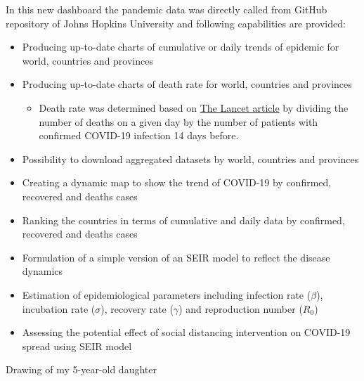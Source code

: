 \documentclass[
]{article}
\providecommand{\tightlist}{%
  \setlength{\itemsep}{0pt}\setlength{\parskip}{0pt}}
\begin{document}
In this new dashboard the pandemic data was directly called from GitHub
repository of Johns Hopkins University and following capabilities are
provided:

\begin{itemize}
\tightlist
\item
  Producing up-to-date charts of cumulative or daily trends of epidemic
  for world, countries and provinces
\item
  Producing up-to-date charts of death rate for world, countries and
  provinces

  \begin{itemize}
  \tightlist
  \item
    Death rate was determined based on
    \href{https://www.thelancet.com/journals/laninf/article/PIIS1473-3099\%2820\%2930195-X/fulltext}{The
    Lancet article} by dividing the number of deaths on a given day by
    the number of patients with confirmed COVID-19 infection 14 days
    before.
  \end{itemize}
\item
  Possibility to download aggregated datasets by world, countries and
  provinces
\item
  Creating a dynamic map to show the trend of COVID-19 by confirmed,
  recovered and deaths cases
\item
  Ranking the countries in terms of cumulative and daily data by
  confirmed, recovered and deaths cases
\item
  Formulation of a simple version of an SEIR model to reflect the
  disease dynamics
\item
  Estimation of epidemiological parameters including infection rate
  (\(\beta\)), incubation rate (\(\sigma\)), recovery rate (\(\gamma\))
  and reproduction number (\(R_0\))
\item
  Assessing the potential effect of social distancing intervention on
  COVID-19 spread using SEIR model
\end{itemize}

Drawing of my 5-year-old daughter
\end{document}
